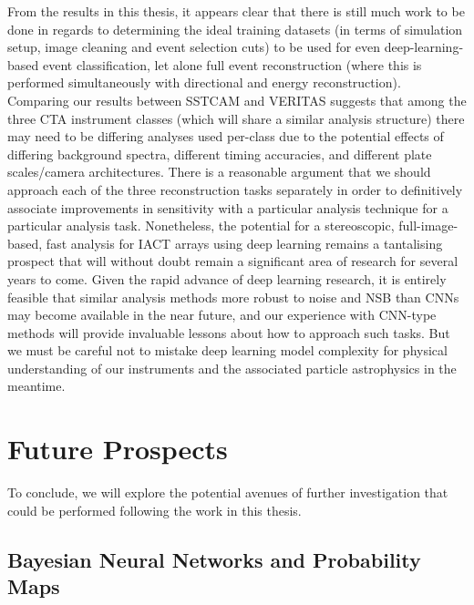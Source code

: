 From the results in this thesis, it appears clear that there is still much work to be done in regards to determining the ideal training datasets (in terms of simulation setup, image cleaning and event selection cuts) to be used for even deep-learning-based event classification, let alone full event reconstruction (where this is performed simultaneously with directional and energy reconstruction). Comparing our results between SSTCAM and VERITAS suggests that among the three CTA instrument classes (which will share a similar analysis structure) there may need to be differing analyses used per-class due to the potential effects of differing background spectra, different timing accuracies, and different plate scales/camera architectures. There is a reasonable argument that we should approach each of the three reconstruction tasks separately in order to definitively associate improvements in sensitivity with a particular analysis technique for a particular analysis task. Nonetheless, the potential for a stereoscopic, full-image-based, fast analysis for IACT arrays using deep learning remains a tantalising prospect that will without doubt remain a significant area of research for several years to come. Given the rapid advance of deep learning research, it is entirely feasible that similar analysis methods more robust to noise and NSB than CNNs may become available in the near future, and our experience with CNN-type methods will provide invaluable lessons about how to approach such tasks. But we must be careful not to mistake deep learning model complexity for physical understanding of our instruments and the associated particle astrophysics in the meantime.

\section{Future Prospects}
To conclude, we will explore the potential avenues of further investigation that could be performed following the work in this thesis.

\subsection{Bayesian Neural Networks and Probability Maps}

